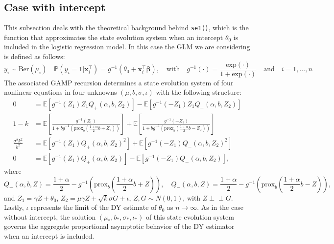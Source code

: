 \documentclass{article}
\begin{document}
\subsection{Case with intercept}
This subsection deals with the theoretical background behind \texttt{se1()}, which is the function that approximates the state evolution system when an intercept $\theta_0$ is included in the logistic regression model. In this case the GLM we are considering is defined as follows:
\begin{equation*}
y_i\sim\text{Ber}(\mu_i)\quad
\mathbb{P}(y_i=1|\mathbf{x}_i^\top)=g^{-1}(\theta_0+\mathbf{x}_i^\top\boldsymbol{\beta}),\quad \text{with}\quad g^{-1}(\cdot)=\frac{\text{exp}(\cdot)}{1+\text{exp}(\cdot)}\quad \text{and}\quad i=1,\dots,n
\end{equation*}
The associated GAMP recursion determines a state evolution system of four nonlinear equations in four unknowns $(\mu,b,\sigma,\iota)$ with the following structure:
\begin{align*}
0&=\mathbb{E}[g^{-1}(Z_1)Z_1Q_{+}(\alpha,b,Z_2)]-\mathbb{E}[g^{-1}(-Z_1)Z_1Q_{-}(\alpha,b,Z_2)]\\[10pt]
1-k&=\mathbb{E}\left[\frac{g^{-1}(Z_1)}{1+b\dot{g}^{-1}(\text{prox}_b(\frac{1+\alpha}{2}b+Z_2))}\right]+\mathbb{E}\left[\frac{g^{-1}(-Z_1)}{1+b\dot{g}^{-1}(\text{prox}_b(\frac{1+\alpha}{2}b-Z_2))}\right]\\[10pt]
\frac{\sigma^2k^2}{b^2}&=\mathbb{E}[g^{-1}(Z_1)Q_{+}(\alpha,b,Z_2)^2]+\mathbb{E}[g^{-1}(-Z_1)Q_{-}(\alpha,b,Z_2)^2]\\[10pt]
0&=\mathbb{E}[g^{-1}(Z_1)Q_{+}(\alpha,b,Z_2)]-\mathbb{E}[g^{-1}(-Z_1)Q_{-}(\alpha,b,Z_2)],
\end{align*}
where
\begin{equation*}
Q_{+}(\alpha,b,Z)=\frac{1+\alpha}{2}-g^{-1}\left(\text{prox}_b\left(\frac{1+\alpha}{2}b+Z\right)\right),\quad Q_{-}(\alpha,b,Z)=\frac{1+\alpha}{2}-g^{-1}\left(\text{prox}_b\left(\frac{1+\alpha}{2}b-Z\right)\right),
\end{equation*}
and $Z_1=\gamma Z+\theta_0$, $Z_2=\mu\gamma Z+\sqrt{k}\sigma G+\iota$, $Z,G\sim N(0,1)$, with $Z\perp\!\!\!\perp G$. Lastly, $\iota$ represents the limit of the DY estimate of $\theta_0$ as $n\longrightarrow \infty$. 
As in the case without intercept, the solution $(\mu_*,b_*,\sigma_*,\iota_*)$ of this state evolution system governs the aggregate proportional asymptotic behavior of the DY estimator when an intercept is included. 
\end{document}
